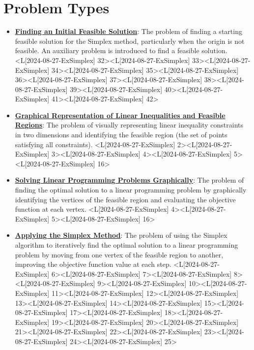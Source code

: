 \documentclass{article}%
\begin{document}
%
\section{Problem Types}%
\label{sec:ProblemTypes}%
\begin{itemize}[[leftmargin=*]]%
\item \href{https://www.math.purdue.edu/~yipn/421/2024-08-27-ExSimplex.pdf#page=32}{\textbf{Finding an Initial Feasible Solution}}: The problem of finding a starting feasible solution for the Simplex method, particularly when the origin is not feasible. An auxiliary problem is introduced to find a feasible solution. <L[2024-08-27-ExSimplex] 32><L[2024-08-27-ExSimplex] 33><L[2024-08-27-ExSimplex] 34><L[2024-08-27-ExSimplex] 35><L[2024-08-27-ExSimplex] 36><L[2024-08-27-ExSimplex] 37><L[2024-08-27-ExSimplex] 38><L[2024-08-27-ExSimplex] 39><L[2024-08-27-ExSimplex] 40><L[2024-08-27-ExSimplex] 41><L[2024-08-27-ExSimplex] 42>%
\item \href{https://www.math.purdue.edu/~yipn/421/2024-08-27-ExSimplex.pdf#page=2}{\textbf{Graphical Representation of Linear Inequalities and Feasible Regions}}: The problem of visually representing linear inequality constraints in two dimensions and identifying the feasible region (the set of points satisfying all constraints). <L[2024-08-27-ExSimplex] 2><L[2024-08-27-ExSimplex] 3><L[2024-08-27-ExSimplex] 4><L[2024-08-27-ExSimplex] 5><L[2024-08-27-ExSimplex] 16>%
\item \href{https://www.math.purdue.edu/~yipn/421/2024-08-27-ExSimplex.pdf#page=4}{\textbf{Solving Linear Programming Problems Graphically}}: The problem of finding the optimal solution to a linear programming problem by graphically identifying the vertices of the feasible region and evaluating the objective function at each vertex. <L[2024-08-27-ExSimplex] 4><L[2024-08-27-ExSimplex] 5><L[2024-08-27-ExSimplex] 16>%
\item \href{https://www.math.purdue.edu/~yipn/421/2024-08-27-ExSimplex.pdf#page=6}{\textbf{Applying the Simplex Method}}: The problem of using the Simplex algorithm to iteratively find the optimal solution to a linear programming problem by moving from one vertex of the feasible region to another, improving the objective function value at each step. <L[2024-08-27-ExSimplex] 6><L[2024-08-27-ExSimplex] 7><L[2024-08-27-ExSimplex] 8><L[2024-08-27-ExSimplex] 9><L[2024-08-27-ExSimplex] 10><L[2024-08-27-ExSimplex] 11><L[2024-08-27-ExSimplex] 12><L[2024-08-27-ExSimplex] 13><L[2024-08-27-ExSimplex] 14><L[2024-08-27-ExSimplex] 15><L[2024-08-27-ExSimplex] 17><L[2024-08-27-ExSimplex] 18><L[2024-08-27-ExSimplex] 19><L[2024-08-27-ExSimplex] 20><L[2024-08-27-ExSimplex] 21><L[2024-08-27-ExSimplex] 22><L[2024-08-27-ExSimplex] 23><L[2024-08-27-ExSimplex] 24><L[2024-08-27-ExSimplex] 25>%

\end{itemize}
\end{document}
